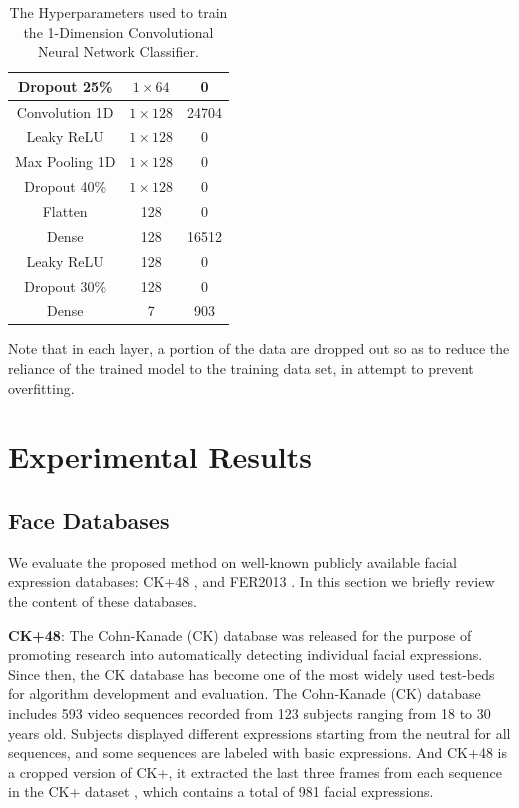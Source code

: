 \documentclass[10pt,twocolumn,letterpaper]{article}
\begin{document}
\begin{enumerate}
\begin{table}[h!]
\begin{tabular}{|c|c|c|}
            Dropout 25\% & $1 \times 64$ & 0 \\ \hline
            Convolution 1D & $1 \times 128$ & 24704 \\ \hline
            Leaky ReLU & $1 \times 128$ & 0 \\ \hline
            Max Pooling 1D & $1 \times 128$ & 0 \\ \hline
            Dropout 40\% & $1 \times 128$ & 0 \\ \hline
            Flatten & 128 & 0 \\ \hline
            Dense & 128 & 16512 \\ \hline
            Leaky ReLU & 128 & 0 \\ \hline
            Dropout 30\% & 128 & 0 \\ \hline
            Dense & 7 & 903 \\ \hline
        \end{tabular}
        \caption{The Hyperparameters used to train the 1-Dimension Convolutional Neural Network Classifier.}
        \label{tab:cnn_hp}
    \end{table}
    
    Note that in each layer, a portion of the data are dropped out so as to reduce the reliance of the trained model to the training data set, in attempt to prevent overfitting. 

\end{enumerate}

\section{Experimental Results}
\subsection{Face Databases}

We evaluate the proposed method on well-known publicly available facial expression databases: CK+48 \cite{Article08}, and FER2013 \cite{Article10}. In this section we briefly review the content of these databases. 

\textbf{CK+48}: The Cohn-Kanade (CK) \cite{Article08} database was released for the purpose of promoting research into automatically detecting individual facial expressions. Since then, the CK database has become one of the most widely used test-beds for algorithm development and evaluation. The Cohn-Kanade (CK) \cite{Article08} database includes 593 video sequences recorded from 123 subjects ranging from 18 to 30 years old. Subjects displayed different expressions starting from the neutral for all sequences, and some sequences are labeled with basic expressions. \cite{Article09} And CK+48 is a cropped version of CK+, it extracted the last three frames from each sequence in the CK+ dataset \cite{Article08}, which contains a total of 981 facial expressions.
\end{document}
